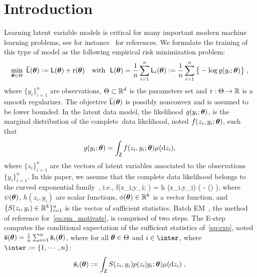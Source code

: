 \documentclass[bj]{imsart}
\numberwithin{equation}{section}
\theoremstyle{plain}
\begin{document}
\section{Introduction}


Learning latent variable models is critical for many important modern machine learning problems, see for instance~\citet{mclachlan2007algorithm} for references.
We formulate the training of this type of model as the following {empirical risk minimization} problem:
\begin{align} \label{eq:em_motivate}
\begin{split} 
 \min_{ \param \in \Param }~ \overline{\calL} ( \param ) \eqdef  \calL ( \param ) + \Pen (\param) \quad \text{with}~~\calL ( \param ) = \frac{1}{n} \sum_{i=1}^n \calL_i( \param) \eqdef  \frac{1}{n} \sum_{i=1}^n \big\{ - \log g( y_i ; \param ) \big\}\eqs,
\end{split} 
\end{align}
where $\{y_i\}_{i=1}^n$ are observations, $\Param \subset \rset^d$ is the parameters set and $\Pen : \Param \rightarrow \rset$ is a smooth regularizer.
The objective $ \overline{\calL} ( \param )$ is possibly {nonconvex} and is assumed to be lower bounded. 
In the latent data model, the likelihood $g(y_i ; \param)$, is the marginal distribution of the complete~data likelihood, noted $f(z_i,y_i; \param)$, such that 
\begin{align}
g(y_i; \param) = \int_{\Zset} f (z_i,y_i;\param) \mu(\rmd z_i),    
\end{align}
where $\{ z_i \}_{i=1}^n$ are the vectors of latent variables associated to the observations $\{y_i\}_{i=1}^n$.
In this paper, we assume that the complete data likelihood belongs to the curved exponential family~\citep{efron1975defining}, i.e.,
\beq \label{eq:exp}
f(z_i,y_i; \param) = h  (z_i,y_i) \exp (  - \psi(\param) )\eqs,
\eeq
where $\psi(\param)$, $h(z_i,y_i)$ are scalar functions, $\phi(\param) \in \rset^k$ is a vector function, and $\{S(z_i,y_i) \in \rset^k\}_{i=1}^n$ is the vector of sufficient statistics.
Batch EM~\citep{dempster1977Maximum, wu1983convergence}, the method of reference for~\eqref{eq:em_motivate}, is comprised of two steps. 
The {E-step} computes the conditional expectation of the sufficient statistics of~\eqref{eq:exp}, noted $\overline{\bss}(\param)= \frac{1}{n} \sum_{i=1}^n \overline{\bss}_i(\param)$, where for all $\param \in \Param$ and $i \in \inter$, where $\inter \eqdef \{1, \cdots, n\}$:
\begin{align}\label{eq:definition-overline-bss}
 \overline{\bss}_i(\param) \eqdef \int_{\Zset} S(z_i,y_i) p(z_i|y_i;\param) \mu(\rmd z_i) \eqsp,
\end{align}
\end{document}
